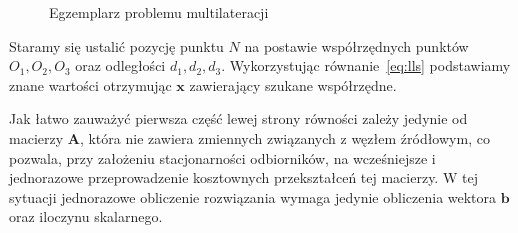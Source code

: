 \begin{figure}[!h]
    \centering
    \caption{Egzemplarz problemu multilateracji}
\label{fig:example}
\end{figure}

Staramy się ustalić pozycję punktu $N$ na postawie współrzędnych punktów $O_1, O_2, O_3$ oraz odległości $d_1, d_2, d_3$. Wykorzystując równanie~\ref{eq:lls} podstawiamy znane wartości otrzymując $\mathbf{x}$ zawierający szukane współrzędne. 

Jak łatwo zauważyć pierwsza część lewej strony równości zależy jedynie od macierzy $\mathbf{A}$, która nie zawiera zmiennych związanych z węzłem źródłowym, co pozwala, przy założeniu stacjonarności odbiorników, na wcześniejsze i jednorazowe przeprowadzenie kosztownych przekształceń tej macierzy. W tej sytuacji jednorazowe obliczenie rozwiązania wymaga jedynie obliczenia wektora $\mathbf{b}$ oraz iloczynu skalarnego.
